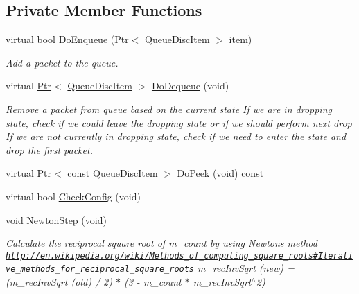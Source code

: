 \subsection*{Private Member Functions}
\begin{DoxyCompactItemize}
\item 
virtual bool \hyperlink{classns3_1_1CoDelQueueDisc_a0c68a40b422edf668a1f225be498ff97}{Do\+Enqueue} (\hyperlink{classns3_1_1Ptr}{Ptr}$<$ \hyperlink{classns3_1_1QueueDiscItem}{Queue\+Disc\+Item} $>$ item)
\begin{DoxyCompactList}\small\item\em Add a packet to the queue. \end{DoxyCompactList}\item 
virtual \hyperlink{classns3_1_1Ptr}{Ptr}$<$ \hyperlink{classns3_1_1QueueDiscItem}{Queue\+Disc\+Item} $>$ \hyperlink{classns3_1_1CoDelQueueDisc_a6128cb8655b87b67f04424c68058e751}{Do\+Dequeue} (void)
\begin{DoxyCompactList}\small\item\em Remove a packet from queue based on the current state If we are in dropping state, check if we could leave the dropping state or if we should perform next drop If we are not currently in dropping state, check if we need to enter the state and drop the first packet. \end{DoxyCompactList}\item 
virtual \hyperlink{classns3_1_1Ptr}{Ptr}$<$ const \hyperlink{classns3_1_1QueueDiscItem}{Queue\+Disc\+Item} $>$ \hyperlink{classns3_1_1CoDelQueueDisc_ab3a785ea16fa4ef303519b7bec301a6c}{Do\+Peek} (void) const 
\item 
virtual bool \hyperlink{classns3_1_1CoDelQueueDisc_a580a58842272e8110ebae6f1503f6327}{Check\+Config} (void)
\item 
void \hyperlink{classns3_1_1CoDelQueueDisc_acca9bb0949833fbd55afe6591d017e18}{Newton\+Step} (void)
\begin{DoxyCompactList}\small\item\em Calculate the reciprocal square root of m\+\_\+count by using Newton\textquotesingle{}s method \href{http://en.wikipedia.org/wiki/Methods_of_computing_square_roots#Iterative_methods_for_reciprocal_square_roots}{\tt http\+://en.\+wikipedia.\+org/wiki/\+Methods\+\_\+of\+\_\+computing\+\_\+square\+\_\+roots\#\+Iterative\+\_\+methods\+\_\+for\+\_\+reciprocal\+\_\+square\+\_\+roots} m\+\_\+rec\+Inv\+Sqrt (new) = (m\+\_\+rec\+Inv\+Sqrt (old) / 2) $\ast$ (3 -\/ m\+\_\+count $\ast$ m\+\_\+rec\+Inv\+Sqrt$^\wedge$2) \end{DoxyCompactList}\item 

\end{DoxyCompactItemize}
